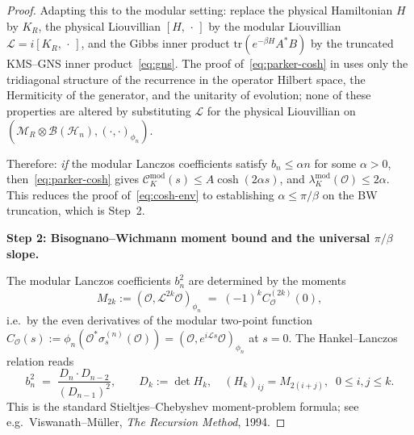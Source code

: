 \documentclass[12pt,a4paper]{article}
\begin{document}
\begin{proof}
Adapting this to the modular setting: replace the physical Hamiltonian
$H$ by $K_R$, the physical Liouvillian $[H,\,\cdot\,]$ by the modular
Liouvillian $\mathcal{L} = i[K_R,\,\cdot\,]$, and the Gibbs inner product
$\mathrm{tr}(e^{-\beta H} A^* B)$ by the truncated KMS--GNS inner
product~\eqref{eq:gns}. The proof of~\eqref{eq:parker-cosh} in
\cite{Parker2019} uses only the tridiagonal structure of the recurrence
in the operator Hilbert space, the Hermiticity of the generator, and
the unitarity of evolution; none of these properties are altered by
substituting $\mathcal{L}$ for the physical Liouvillian on
$(\mathcal{M}_R \otimes \mathcal{B}(\mathcal{H}_n), (\cdot,\cdot)_{\phi_n})$.

Therefore: \emph{if} the modular Lanczos coefficients satisfy
$b_n \le \alpha n$ for some $\alpha > 0$, then~\eqref{eq:parker-cosh}
gives $\mathcal{C}_K^{\mathrm{mod}}(s) \le A\cosh(2\alpha s)$, and
$\lambda_K^{\mathrm{mod}}(\mathcal{O}) \le 2\alpha$.
This reduces the proof of~\eqref{eq:cosh-env} to establishing
$\alpha \le \pi/\beta$ on the BW truncation, which is Step~2.

\medskip

\noindent\textbf{Step 2: Bisognano--Wichmann moment bound and the
universal $\pi/\beta$ slope.}

The modular Lanczos coefficients $b_n^2$ are determined by the moments
\begin{equation}
  M_{2k} := (\mathcal{O}, \mathcal{L}^{2k}\mathcal{O})_{\phi_n}
  \;=\; (-1)^k C_\mathcal{O}^{(2k)}(0),
  \label{eq:moments}
\end{equation}
i.e.\ by the even derivatives of the modular two-point function
$C_\mathcal{O}(s) := \phi_n(\mathcal{O}^* \sigma_s^{(n)}(\mathcal{O}))
= (\mathcal{O}, e^{i\mathcal{L}s}\mathcal{O})_{\phi_n}$ at $s=0$.
The Hankel--Lanczos relation reads
\begin{equation}
  b_n^2 \;=\;
  \frac{D_n \cdot D_{n-2}}{(D_{n-1})^2},
  \qquad
  D_k := \det H_k,\quad
  (H_k)_{ij} = M_{2(i+j)},\;\; 0 \le i,j \le k.
  \label{eq:hankel}
\end{equation}
This is the standard Stieltjes--Chebyshev moment-problem formula; see
e.g.\ Viswanath--M\"uller, \emph{The Recursion Method}, 1994.


\end{proof}
\end{document}
